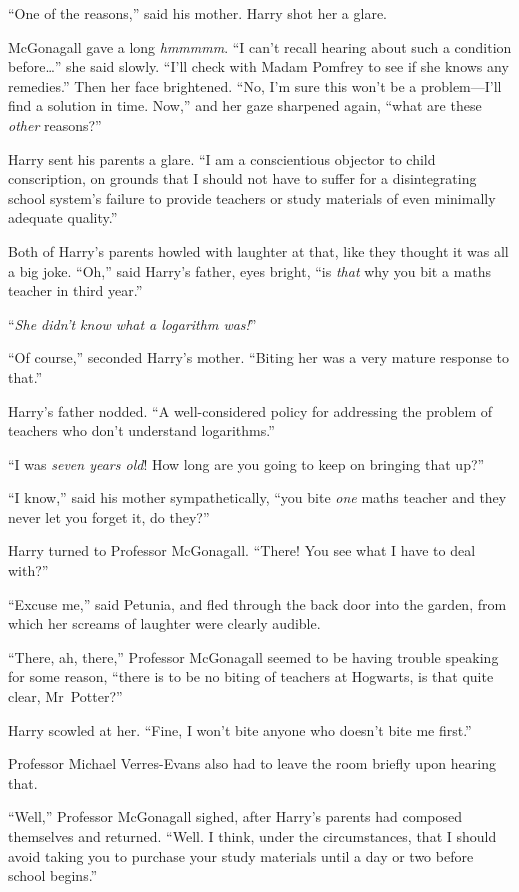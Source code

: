 “One of the reasons,” said his mother.
Harry shot her a glare.

McGonagall gave a long \emph{hmmmmm}.
“I can’t recall hearing about such a condition before…” she said slowly.
“I’ll check with Madam Pomfrey to see if she knows any remedies.” Then her face brightened.
“No, I’m sure this won’t be a problem—I’ll find a solution in time.
Now,” and her gaze sharpened again, “what are these \emph{other} reasons?”

Harry sent his parents a glare.
“I am a conscientious objector to child conscription, on grounds that I should not have to suffer for a disintegrating school system’s failure to provide teachers or study materials of even minimally adequate quality.”

Both of Harry’s parents howled with laughter at that, like they thought it was all a big joke.
“Oh,” said Harry’s father, eyes bright, “is \emph{that} why you bit a maths teacher in third year.”

“\emph{She didn’t know what a logarithm was!}”

“Of course,” seconded Harry’s mother.
“Biting her was a very mature response to that.”

Harry’s father nodded.
“A well-considered policy for addressing the problem of teachers who don’t understand logarithms.”

“I was \emph{seven years old}!
How long are you going to keep on bringing that up?”

“I know,” said his mother sympathetically, “you bite \emph{one} maths teacher and they never let you forget it, do they?”

Harry turned to Professor McGonagall.
“There!
You see what I have to deal with?”

“Excuse me,” said Petunia, and fled through the back door into the garden, from which her screams of laughter were clearly audible.

“There, ah, there,” Professor McGonagall seemed to be having trouble speaking for some reason, “there is to be no biting of teachers at Hogwarts, is that quite clear, Mr~Potter?”

Harry scowled at her.
“Fine, I won’t bite anyone who doesn’t bite me first.”

Professor Michael Verres-Evans also had to leave the room briefly upon hearing that.

“Well,” Professor McGonagall sighed, after Harry’s parents had composed themselves and returned.
“Well.
I think, under the circumstances, that I should avoid taking you to purchase your study materials until a day or two before school begins.”


